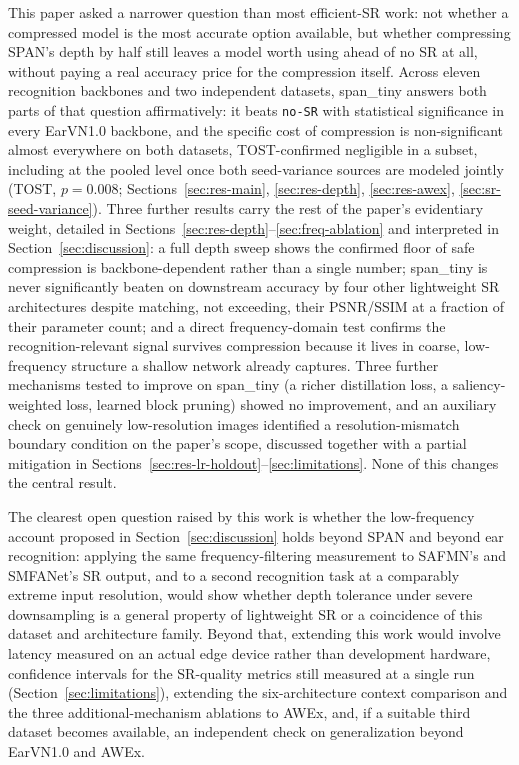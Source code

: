 \documentclass[pdflatex,sn-vancouver-num]{sn-jnl}
\begin{document}
This paper asked a narrower question than most efficient-SR work: not whether a compressed model is the most accurate option available, but whether compressing SPAN's depth by half still leaves a model worth using ahead of no SR at all, without paying a real accuracy price for the compression itself. Across eleven recognition backbones and two independent datasets, span\_tiny answers both parts of that question affirmatively: it beats \texttt{no-SR} with statistical significance in every EarVN1.0 backbone, and the specific cost of compression is non-significant almost everywhere on both datasets, TOST-confirmed negligible in a subset, including at the pooled level once both seed-variance sources are modeled jointly (TOST, $p=0.008$; Sections~\ref{sec:res-main}, \ref{sec:res-depth}, \ref{sec:res-awex}, \ref{sec:sr-seed-variance}). Three further results carry the rest of the paper's evidentiary weight, detailed in Sections~\ref{sec:res-depth}--\ref{sec:freq-ablation} and interpreted in Section~\ref{sec:discussion}: a full depth sweep shows the confirmed floor of safe compression is backbone-dependent rather than a single number; span\_tiny is never significantly beaten on downstream accuracy by four other lightweight SR architectures despite matching, not exceeding, their PSNR/SSIM at a fraction of their parameter count; and a direct frequency-domain test confirms the recognition-relevant signal survives compression because it lives in coarse, low-frequency structure a shallow network already captures. Three further mechanisms tested to improve on span\_tiny (a richer distillation loss, a saliency-weighted loss, learned block pruning) showed no improvement, and an auxiliary check on genuinely low-resolution images identified a resolution-mismatch boundary condition on the paper's scope, discussed together with a partial mitigation in Sections~\ref{sec:res-lr-holdout}--\ref{sec:limitations}. None of this changes the central result.

The clearest open question raised by this work is whether the low-frequency account proposed in Section~\ref{sec:discussion} holds beyond SPAN and beyond ear recognition: applying the same frequency-filtering measurement to SAFMN's and SMFANet's SR output, and to a second recognition task at a comparably extreme input resolution, would show whether depth tolerance under severe downsampling is a general property of lightweight SR or a coincidence of this dataset and architecture family. Beyond that, extending this work would involve latency measured on an actual edge device rather than development hardware, confidence intervals for the SR-quality metrics still measured at a single run (Section~\ref{sec:limitations}), extending the six-architecture context comparison and the three additional-mechanism ablations to AWEx, and, if a suitable third dataset becomes available, an independent check on generalization beyond EarVN1.0 and AWEx.
\end{document}
